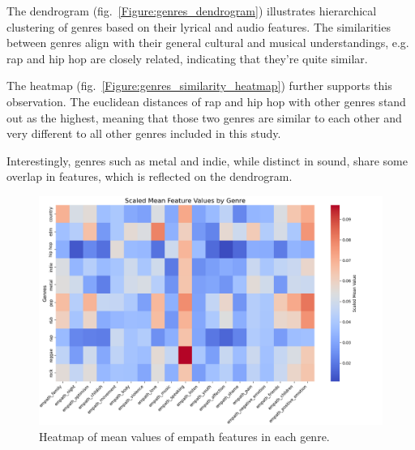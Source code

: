 The dendrogram (fig.~\ref{Figure:genres_dendrogram}) illustrates hierarchical clustering of genres based on their
lyrical and audio features. The similarities between genres align with their
general cultural and musical understandings, e.g. rap and hip hop are closely
related, indicating that they're quite similar. 

The heatmap (fig.~\ref{Figure:genres_similarity_heatmap}) further supports this observation. The euclidean distances of rap
and hip hop with other genres stand out as the highest, meaning that those two
genres are similar to each other and very different to all other genres
included in this study. 

Interestingly, genres such as metal and indie, while
distinct in sound, share some overlap in features, which is reflected on the
dendrogram.


\begin{center}
\begin{figure}[H]
  \centering
  \includegraphics[width=6in]{img/heatmap_of_empath.png}
  \caption{Heatmap of mean values of empath features in each genre.}
  \label{Figure:heatmap_empath}
\end{figure}
\end{center}

